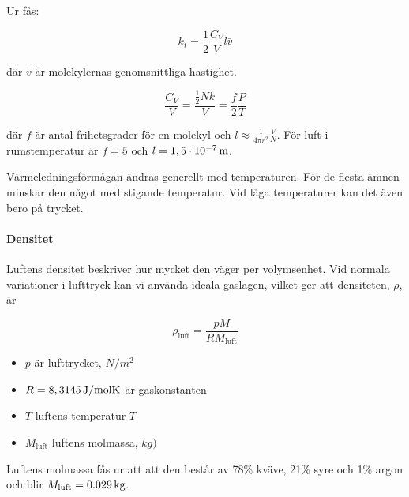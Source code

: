 Ur \cite[s.~41ff]{schroeder00} fås:

\begin{equation}
\label{eq:natconst:schroeder1}
k_t=\frac{1}{2}\frac{C_V}{V} l \bar{v}
\end{equation}

där $\bar{v}$ är molekylernas genomsnittliga hastighet.

\begin{equation}
\label{eq:natconst:schroeder2}
\frac{C_V}{V}=\frac{\tfrac{1}{2}Nk}{V}=\frac{f}{2}\frac{P}{T}
\end{equation}

där $f$ är antal frihetsgrader för en molekyl och $l\approx\frac{1}{4\pi r^2}\frac{V}{N}$. För luft i rumstemperatur är $f=5$ och $l=\unit[1,5\cdot 10^{-7}]{m}$.

Värmeledningsförmågan ändras generellt med temperaturen. För de flesta ämnen minskar den något med stigande temperatur. Vid låga temperaturer kan det även bero på trycket. 



\paragraph{Densitet} %
\label{sec:densitet}


Luftens densitet beskriver hur mycket den väger per volymsenhet. Vid normala variationer i lufttryck kan vi använda ideala gaslagen, vilket ger att densiteten, $\rho$, är

\begin{equation}
\rho_\text{luft}=\frac{p M}{R M_\text{luft}}
\end{equation}

\begin{itemize}
   \item[] $p$ är lufttrycket, $\unit{N/m^2}$
   \item[] $R=\unit[8,3145]{J/ molK}$ är gaskonstanten
   \item[] $T$ luftens temperatur $\unit{T}$
   \item[] $M_\text{luft}$ luftens molmassa, $\unit{kg)}$
\end{itemize}

Luftens molmassa fås ur att att den består av 78\% kväve, 21\% syre och 1\% argon och blir $M_\text{luft}=\unit[0.029]{kg}$.

